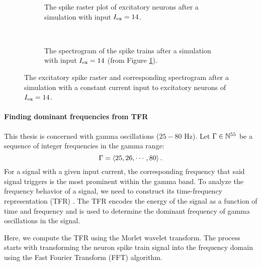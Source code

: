\begin{figure}[!htp]
    \centering
    \begin{subfigure}[b]{\textwidth}
        \centering
        
        \vspace{-\baselineskip}
        \caption{The spike raster plot of excitatory neurons after a simulation with input $I_{\mathrm{ex}} = 14$.}
        \label{fig:fc14raster}
    \end{subfigure}
    \\ \vspace{\baselineskip}
    \begin{subfigure}[b]{\textwidth}
        \centering
        
        \caption{The spectrogram of the spike trains after a simulation with input $I_{\mathrm{ex}} = 14$ (from Figure \ref{fig:fc14raster}).}
        \label{fig:fc14tfr}
    \end{subfigure}
    \caption[Spike raster and spectrogram for constant current]{The excitatory spike raster and corresponding spectrogram after a simulation with a constant current input to excitatory neurons of $I_{\mathrm{ex}} = 14$.}
    \label{fig:fc14}
\end{figure}


\paragraph{Finding dominant frequencies from TFR}

This thesis is concerned with gamma oscillations ($25 - 80$ Hz). Let $\Gamma \in \mathbb{N}^{55}$ be a sequence of integer frequencies in the gamma range:
\begin{equation}
    \Gamma = \left<
    25, 26, \cdots, 80
    \right>.
\end{equation}
For a signal with a given input current, the corresponding frequency that said signal triggers is the most prominent within the gamma band. To analyze the frequency behavior of a signal, we need to construct its time-frequency representation (TFR) \cite{Lowet2015}. 
The TFR encodes the energy of the signal as a function of time and frequency and is used to determine the dominant frequency of gamma oscillations in the signal.

Here, we compute the TFR using the Morlet wavelet transform.
The process starts with transforming the neuron spike train signal into the frequency domain using the Fast Fourier Transform (FFT) algorithm.

